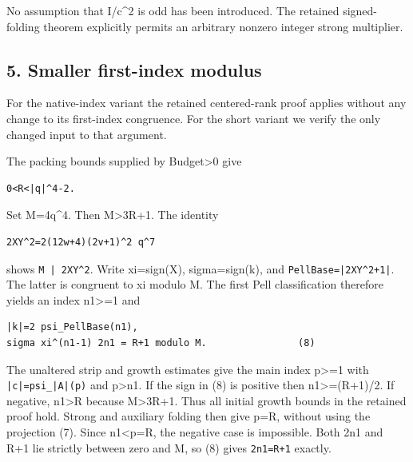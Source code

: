 No assumption that I/\allowbreak{}c\textasciicircum{}\allowbreak{}2 is odd has been introduced. The retained signed-folding theorem explicitly permits an arbitrary nonzero integer strong multiplier.



\subsection{5. Smaller first-index modulus}



For the native-index variant the retained centered-rank proof applies without any change to its first-index congruence. For the short variant we verify the only changed input to that argument.



The packing bounds supplied by Budget\textgreater{}\allowbreak{}0 give



\begin{verbatim}
0<R<|q|^4-2.
\end{verbatim}

Set M=\allowbreak{}4q\textasciicircum{}\allowbreak{}4. Then M\textgreater{}\allowbreak{}3R+\allowbreak{}1. The identity



\begin{verbatim}
2XY^2=2(12w+4)(2v+1)^2 q^7
\end{verbatim}

shows \texttt{M | 2XY\textasciicircum{}\allowbreak{}2}. Write xi=\allowbreak{}sign(X), sigma=\allowbreak{}sign(k), and \texttt{PellBase=\allowbreak{}|2XY\textasciicircum{}\allowbreak{}2+\allowbreak{}1|}. The latter is congruent to xi modulo M. The first Pell classification therefore yields an index n1\textgreater{}\allowbreak{}=\allowbreak{}1 and



\begin{verbatim}
|k|=2 psi_PellBase(n1),
sigma xi^(n1-1) 2n1 = R+1 modulo M.                (8)
\end{verbatim}

The unaltered strip and growth estimates give the main index p\textgreater{}\allowbreak{}=\allowbreak{}1 with \texttt{|c|=\allowbreak{}psi\_\allowbreak{}|A|(p)} and p\textgreater{}\allowbreak{}n1. If the sign in (8) is positive then n1\textgreater{}\allowbreak{}=\allowbreak{}(R+\allowbreak{}1)/\allowbreak{}2. If negative, n1\textgreater{}\allowbreak{}R because M\textgreater{}\allowbreak{}3R+\allowbreak{}1. Thus all initial growth bounds in the retained proof hold. Strong and auxiliary folding then give p=\allowbreak{}R, without using the projection (7). Since n1\textless{}\allowbreak{}p=\allowbreak{}R, the negative case is impossible. Both 2n1 and R+\allowbreak{}1 lie strictly between zero and M, so (8) gives \texttt{2n1=\allowbreak{}R+\allowbreak{}1} exactly.



